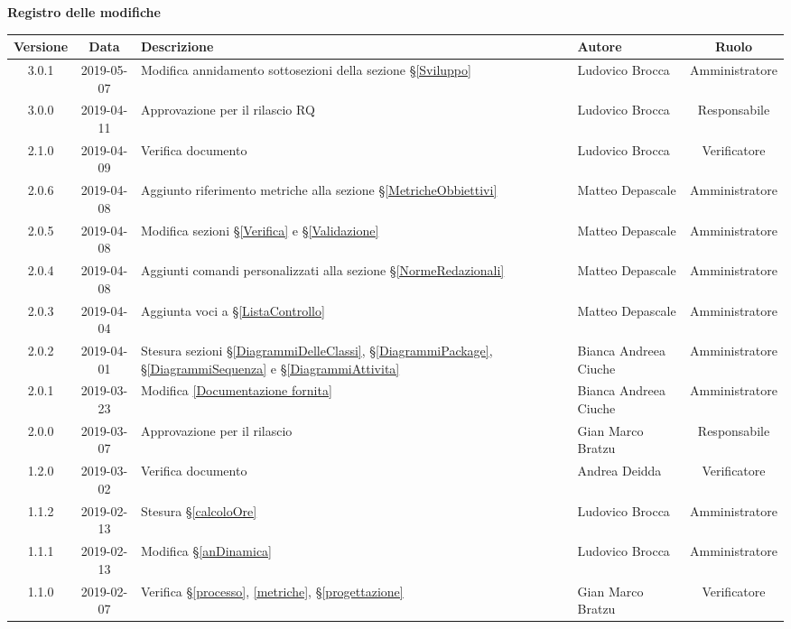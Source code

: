 \begin{center}
	\textbf{Registro delle modifiche}
	\end{center}
	\begin{center}
		\begin{tabularx}{\textwidth}{|c|c|X|X|c|}
			\hline
			\textbf{Versione} & \textbf{Data} & \textbf{Descrizione} & \textbf{Autore} & \textbf{Ruolo} \\ 
			\hline
			3.0.1 & 2019-05-07 & Modifica annidamento sottosezioni della sezione \S\ref{Sviluppo} & Ludovico Brocca & Amministratore \\
			\hline
			3.0.0 & 2019-04-11 & Approvazione per il rilascio RQ & Ludovico Brocca & Responsabile \\
			\hline
			2.1.0 & 2019-04-09 & Verifica documento & Ludovico Brocca & Verificatore \\
			\hline
			2.0.6 & 2019-04-08 & Aggiunto riferimento metriche alla sezione \S\ref{MetricheObbiettivi} &Matteo Depascale & Amministratore \\
			\hline 
			2.0.5 & 2019-04-08 & Modifica sezioni \S\ref{Verifica}  e \S\ref{Validazione} & Matteo Depascale & Amministratore \\
			\hline
			2.0.4 & 2019-04-08 & Aggiunti comandi personalizzati alla sezione \S\ref{NormeRedazionali} &Matteo Depascale & Amministratore \\
			\hline
			2.0.3 & 2019-04-04 & Aggiunta voci a \S\ref{ListaControllo} & Matteo Depascale & Amministratore \\
			\hline
			2.0.2 & 2019-04-01 & Stesura sezioni \S\ref{DiagrammiDelleClassi}, \S\ref{DiagrammiPackage}, \S\ref{DiagrammiSequenza} e \S\ref{DiagrammiAttivita}  & Bianca Andreea Ciuche & Amministratore \\
			\hline
			2.0.1 & 2019-03-23 & Modifica \ref{Documentazione fornita} & Bianca Andreea Ciuche & Amministratore \\
			\hline
			2.0.0 &2019-03-07 & Approvazione per il rilascio & Gian Marco Bratzu& Responsabile\\
			\hline
			1.2.0 &2019-03-02 & Verifica documento &Andrea Deidda& Verificatore\\
			\hline
			1.1.2 &2019-02-13 &Stesura \S\ref{calcoloOre} &Ludovico Brocca& Amministratore\\
			\hline
			1.1.1 &2019-02-13 &Modifica \S\ref{anDinamica} &Ludovico Brocca& Amministratore\\
			\hline
			1.1.0 &2019-02-07 &Verifica \S\ref{processo}, \ref{metriche}, \S\ref{progettazione} &Gian Marco Bratzu& Verificatore\\

\end{tabularx}
\end{center}

